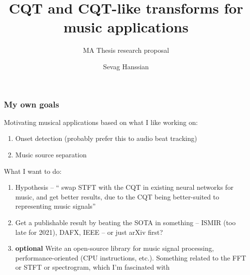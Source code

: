 \documentclass[usenames,dvipsnames]{beamer}
\title{CQT and CQT-like transforms for music applications}
\subtitle{MA Thesis research proposal}
\author{Sevag Hanssian}
\institute{DDMAL, McGill}
\begin{document}
\begin{frame}
\maketitle
\end{frame}

\begin{frame}
	\frametitle{My own goals}
	Motivating musical applications based on what I like working on:
	\begin{enumerate}
		\item
			Onset detection (probably prefer this to audio beat tracking)
		\item
			Music source separation
	\end{enumerate}

	What I want to do:
	\begin{enumerate}
		\item
			Hypothesis -- `` swap STFT with the CQT in existing neural networks for music, and get better results, due to the CQT being better-suited to representing music signals''
		\item
			Get a publishable result by beating the SOTA in something -- ISMIR (too late for 2021), DAFX, IEEE -- or just arXiv first?
		\item
			\textbf{optional} Write an open-source library for music signal processing, performance-oriented (CPU instructions, etc.). Something related to the FFT or STFT or spectrogram, which I'm fascinated with
	\end{enumerate}
\end{frame}
\end{document}
